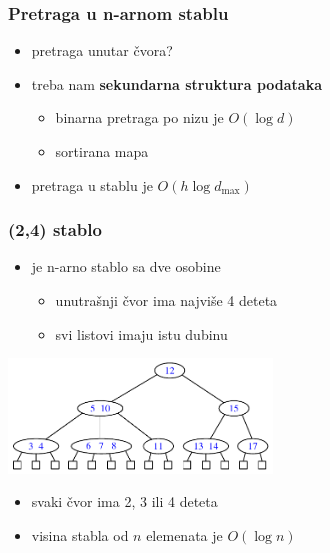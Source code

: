 \documentclass[compress]{beamer}
\begin{document}
\begin{frame}[fragile]
  \frametitle{Pretraga u n-arnom stablu}
  \begin{itemize}
    \item pretraga unutar čvora?
    \item treba nam \textbf{sekundarna struktura podataka}
    \begin{itemize}
      \item binarna pretraga po nizu je $O(\log d)$
      \item sortirana mapa
    \end{itemize}
    \item pretraga u stablu je $O(h\log d_{\max})$
  \end{itemize}
\end{frame}

\begin{frame}[fragile]
  \frametitle{(2,4) stablo}
  \begin{itemize}
    \item {} je n-arno stablo sa dve osobine
    \begin{itemize}
      \item unutrašnji čvor ima najviše 4 deteta
      \item svi listovi imaju istu dubinu
    \end{itemize}
  \end{itemize}
  \begin{center}
    \includegraphics[width=7cm]{asp-11-pic30.pdf}
  \end{center}
  \begin{itemize}
    \item svaki čvor ima 2, 3 ili 4 deteta
    \item visina stabla od $n$ elemenata je $O(\log n)$ 
  \end{itemize}
\end{frame}
\end{document}
